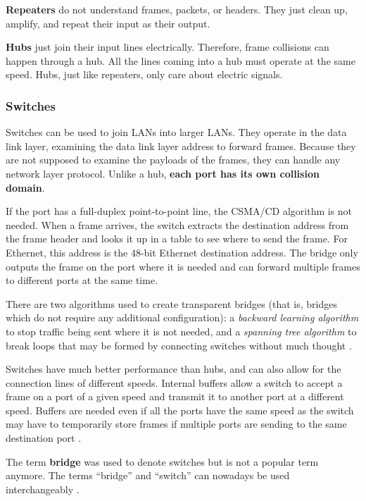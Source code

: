 \textbf{Repeaters} do not understand frames, packets, or headers.
They just clean up, amplify, and repeat their input as their output.

\textbf{Hubs} just join their input lines electrically.
Therefore, frame collisions can happen through a hub.
All the lines coming into a hub must operate at the same speed.
Hubs, just like repeaters, only care about electric signals.

\subsubsection{Switches}

Switches can be used to join LANs into larger LANs.
They operate in the data link layer, examining the data link layer address to forward frames.
Because they are not supposed to examine the payloads of the frames, they can handle any network layer protocol.
Unlike a hub, \textbf{each port has its own collision domain}.

If the port has a full-duplex point-to-point line, the CSMA/CD algorithm is not needed.
When a frame arrives, the switch extracts the destination address from the frame header and looks it up in a table to see where to send the frame.
For Ethernet, this address is the 48-bit Ethernet destination address.
The bridge only outputs the frame on the port where it is needed and can forward multiple frames to different ports at the same time.

There are two algorithms used to create transparent bridges (that is, bridges which do not require any additional configuration): a \textit{backward learning algorithm} to stop traffic being sent where it is not needed, and a \textit{spanning tree algorithm} to break loops that may be formed by connecting switches without much thought \cite[p.~333]{computer-networks-tanenbaum-2012}.

Switches have much better performance than hubs, and can also allow for the connection lines of different speeds. Internal buffers allow a switch to accept a frame on a port of a given speed and transmit it to another port at a different speed. Buffers are needed even if all the ports have the same speed as the switch may have to temporarily store frames if multiple ports are sending to the same destination port \cite[p.~341]{computer-networks-tanenbaum-2012}.

The term \textbf{bridge} was used to denote switches but is not a popular term anymore. The terms ``bridge'' and ``switch'' can nowadays be used interchangeably \cite[p.~350]{computer-networks-tanenbaum-2012}.

